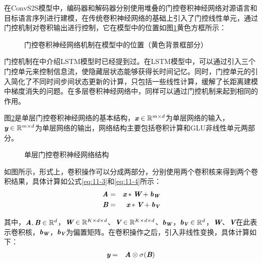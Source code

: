 \parinterval 在ConvS2S模型中，编码器和解码器分别使用堆叠的门控卷积神经网络对源语言和目标语言序列进行建模，在传统卷积神经网络的基础上引入了门控线性单元，通过门控机制对卷积输出进行控制，它在模型中的位置如图\ref{fig:11-13}黄色方框所示：

\begin{figure}[htp]
\centering

\caption{门控卷积神经网络机制在模型中的位置（黄色背景框部分）}
\label{fig:11-13}
\end{figure}

\parinterval 门控机制在{\chapterten}中介绍LSTM模型时已经提到过。在LSTM模型中，可以通过引入三个门控单元来控制信息流，使隐藏层状态能够获得长时间记忆。同时，门控单元的引入简化了不同时间步间状态更新的计算，只包括一些线性计算，缓解了长距离建模中梯度消失的问题。在多层卷积神经网络中，同样可以通过门控机制来起到相同的作用。

\parinterval 图\ref{fig:11-14}是单层门控卷积神经网络的基本结构，$\textbf{\em x}\in \mathbb{R}^{m\times d}$为单层网络的输入，$\textbf{\em y} \in \mathbb{R}^{m \times d}$为单层网络的输出，网络结构主要包括卷积计算和GLU非线性单元两部分。

\begin{figure}[htp]
\centering

\caption{单层门控卷积神经网络结构}
\label{fig:11-14}
\end{figure}


\parinterval 如图所示，形式上，卷积操作可以分成两部分，分别使用两个卷积核来得到两个卷积结果，具体计算如公式\eqref{eq:11-3}和\eqref{eq:11-4}所示：
\begin{eqnarray}
\textbf{\em A} & = & \textbf{\em x} * \textbf{\em W} + \textbf{\em b}_{\textbf{\em W}} \label{eq:11-3} \\
\textbf{\em B} & = & \textbf{\em x} * \textbf{\em V} + \textbf{\em b}_{\textbf{\em V}} \label{eq:11-4}
\end{eqnarray}

\noindent 其中，$\textbf{\em A},\textbf{\em B}\in \mathbb{R}^d$，$\textbf{\em W}\in \mathbb{R}^{K\times d \times d}$、$\textbf{\em V}\in \mathbb{R}^{K\times d \times d}$、$\textbf{\em b}_{\textbf{\em W}}$，$\textbf{\em b}_{\textbf{\em V}} \in \mathbb{R}^d $，$\textbf{\em W}$、$\textbf{\em V}$在此表示卷积核，$\textbf{\em b}_{\textbf{\em W}}$，$\textbf{\em b}_{\textbf{\em V}}$为偏置矩阵。在卷积操作之后，引入非线性变换，具体计算如下：
\begin{eqnarray}
\textbf{\em y} & = & \textbf{\em A} \otimes \sigma ( \textbf{\em B} )
\label{eq:11-5}
\end{eqnarray}

